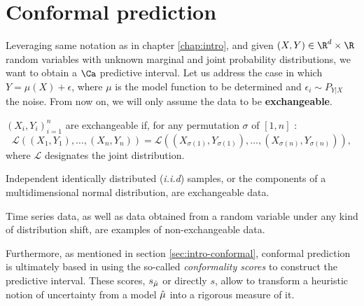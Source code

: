 
\chapter{Conformal prediction}

\label{chap:conformal-prediction}



Leveraging same notation as in chapter \ref{chap:intro}, and given $(X, Y)\in \R^d\times\R$ random variables with unknown marginal and joint probability distributions, we want to obtain a $\Ca$ predictive interval. Let us address the case in which $Y=\mu(X) + \epsilon$, where $\mu$ is the model function to be determined and $\epsilon_i\sim P_{Y|X}$ the noise. From now on, we will only assume the data to be \textbf{exchangeable}. 


\begin{definition}[Exchangeability]
$\left(X_i, Y_i\right)_{i=1}^n$ are exchangeable if, for any permutation $\sigma$ of $\left[ 1, n \right]$ :
$$
\mathcal{L}\left(\left(X_1, Y_1\right), \ldots,\left(X_n, Y_n\right)\right)=\mathcal{L}\left(\left(X_{\sigma(1)}, Y_{\sigma(1)}\right), \ldots,\left(X_{\sigma(n)}, Y_{\sigma(n)}\right)\right),
$$
where $\mathcal{L}$ designates the joint distribution.
\end{definition}

\begin{example}
    Independent identically distributed (\textit{i.i.d}) samples, or the components of a multidimensional normal distribution, are exchangeable data.
\end{example}
\begin{example}
    Time series data, as well as data obtained from a random variable under any kind of distribution shift, are examples of non-exchangeable data.
\end{example}

Furthermore, as mentioned in section \ref{sec:intro-conformal}, conformal prediction is ultimately based in using the so-called \textit{conformality scores} to construct the predictive interval. These scores, $s_{\Hat{\mu}}$ or directly $s$, allow to transform a heuristic notion of uncertainty from a model $\Hat{\mu}$ into a rigorous measure of it.

